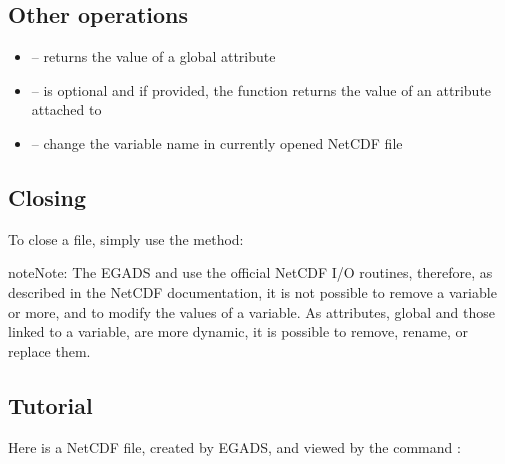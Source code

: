 \documentclass[a4paper,10pt,openany,english]{sphinxmanual}
\begin{document}
\subsection{Other operations}
\label{tutorial:other-operations}\begin{itemize}
\item {} 
 -- returns the value of a global attribute

\item {} 
 --  is optional and if provided, the function returns the value of an attribute attached to 

\item {} 
 -- change the variable name in currently opened NetCDF file

\end{itemize}


\subsection{Closing}
\label{tutorial:id11}
To close a file, simply use the  method:

\begin{sphinxVerbatim}[commandchars=\\\{\}]
\end{sphinxVerbatim}

\begin{sphinxadmonition}{note}{Note:}
The EGADS {\hyperref[egadsapi:egads.input.netcdf_io.NetCdf]{}} and {\hyperref[egadsapi:egads.input.netcdf_io.EgadsNetCdf]{}} use the official NetCDF I/O routines, therefore, as described in the NetCDF documentation, it is not possible to remove a variable or more, and to modify the values of a variable. As attributes, global and those linked to a variable, are more dynamic, it is possible to remove, rename, or replace them.
\end{sphinxadmonition}


\subsection{Tutorial}
\label{tutorial:id12}
Here is a NetCDF file, created by EGADS, and viewed by the command :
\end{document}
